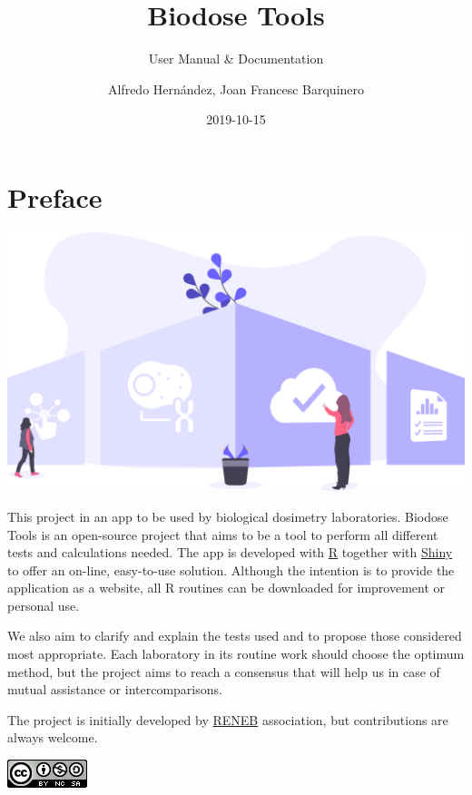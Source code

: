 \documentclass[]{scrartcl}
\title{Biodose Tools}
\subtitle{User Manual \& Documentation}
\author{Alfredo Hernández, Joan Francesc Barquinero}
\date{2019-10-15}
\begin{document}

\maketitle

{
\setcounter{tocdepth}{2}
\tableofcontents
}
\hypertarget{preface}{%
\section*{Preface}\label{preface}}

\begin{center}\includegraphics[width=0.8\linewidth]{images/home} \end{center}

This project in an app to be used by biological dosimetry laboratories. Biodose Tools is an open-source project that aims to be a tool to perform all different tests and calculations needed. The app is developed with \href{https://www.r-project.org/about.html}{R} \citep{R-base} together with \href{https://shiny.rstudio.com}{Shiny} \citep{R-shiny} to offer an on-line, easy-to-use solution. Although the intention is to provide the application as a website, all R routines can be downloaded for improvement or personal use.

We also aim to clarify and explain the tests used and to propose those considered most appropriate. Each laboratory in its routine work should choose the optimum method, but the project aims to reach a consensus that will help us in case of mutual assistance or intercomparisons.

The project is initially developed by \href{http://www.reneb.net}{RENEB} association, but contributions are always welcome.

\begin{center}\includegraphics[width=0.92in]{images/by-nc-sa} \end{center}
\end{document}
